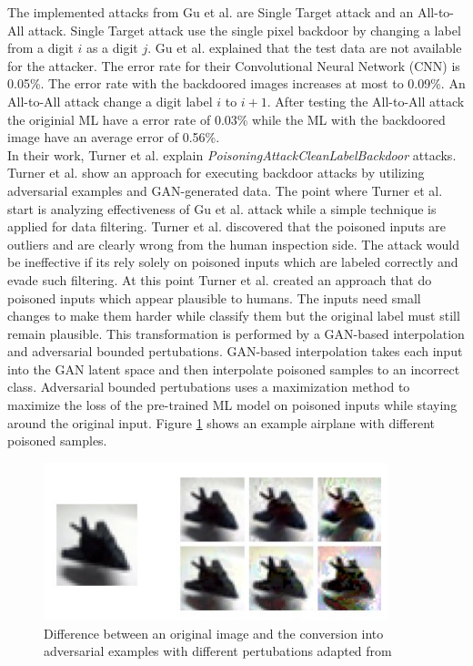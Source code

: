The implemented attacks from Gu et al. are Single Target attack and an All-to-All attack. Single Target attack use the single pixel backdoor by changing a label from a digit $i$ as a digit $j$. Gu et al. explained that the test data are not available for the attacker. The error rate for their Convolutional Neural Network (CNN) is 0.05\%. The error rate with the backdoored images increases at most to 0.09\%. An All-to-All attack change a digit label $i$ to $i + 1$. After testing the All-to-All attack the originial ML have a error rate of 0.03\% while the ML with the backdoored image have an average error of 0.56\%. \\
In their work, Turner et al. \cite{turner2018clean} explain
\textit{PoisoningAttackCleanLabelBackdoor} attacks. Turner et al. show an approach for executing backdoor attacks by utilizing adversarial examples and GAN-generated data. The point where Turner et al. start is analyzing effectiveness of Gu et al. attack while a simple technique is applied for data filtering. Turner et al. discovered that the poisoned inputs are outliers and are clearly wrong from the human inspection side. The attack would be ineffective if its rely solely on poisoned inputs which are labeled correctly and evade such filtering. At this point Turner et al. created an approach that do poisoned inputs which appear plausible to humans. The inputs need small changes to make them harder while classify them but the original label must still remain plausible. This transformation is performed by a GAN-based interpolation and adversarial bounded pertubations. GAN-based interpolation takes each input into the GAN latent space \cite{DBLP:conf/nips/GoodfellowPMXWOCB14} and then interpolate poisoned samples to an incorrect class. Adversarial bounded pertubations uses a maximization method to maximize the loss of the pre-trained ML model on poisoned inputs while staying around the original input. Figure \ref{fig:poisoned_clean_label} shows an example airplane with different poisoned samples.

\begin{figure}[ht!]
  \centering
  \includegraphics[width=10cm]{pictures/poisoned_clean_label.jpg}
  \caption{Difference between an original image and the conversion into adversarial examples with different pertubations adapted from \cite{turner2018clean}}
  \label{fig:poisoned_clean_label}
\end{figure}

